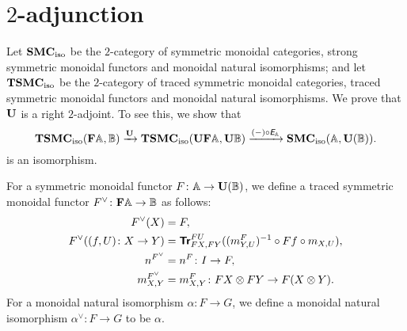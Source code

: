 
\section{\(2\)-adjunction}
\label{2-adjunction}

Let \(\mathbf{SMC}_{\mathrm{iso}}\) be the \(2\)-category of symmetric monoidal categories,
strong symmetric monoidal functors and monoidal natural
isomorphisms; and let \(\mathbf{TSMC}_{\mathrm{iso}}\) be the \(2\)-category of traced
symmetric monoidal categories, traced symmetric monoidal functors and
monoidal natural isomorphisms. We prove that
\(\mathbf{U}\) is a right \(2\)-adjoint. To see this, we show that
\begin{equation*}
  \mathbf{TSMC}_{\mathrm{iso}}(\mathbf{F}\mathbb{A},\mathbb{B}) \xrightarrow{\mathbf{U}}
  \mathbf{TSMC}_{\mathrm{iso}}(\mathbf{U}\mathbf{F}\mathbb{A},\mathbf{U}\mathbb{B}) \xrightarrow{(-) \circ \textit{\textsf{E}}_{\mathbb{A}}}
  \mathbf{SMC}_{\mathrm{iso}}(\mathbb{A},\mathbf{U}(\mathbb{\mathbb{B}})).
\end{equation*}
is an isomorphism.

For a symmetric monoidal functor \(F \colon \mathbb{A} \to \mathbf{U}(\mathbb{B})\),
we define a traced symmetric monoidal functor \(F^{\vee} \colon \mathbf{F}\mathbb{A} \to \mathbb{B}\)
as follows:
\begin{align*}
  F^{\vee}(X) &= F, \\
  F^{\vee}((f,U) \colon X \to Y)
  &= {\normalfont\textsf{\textbf{Tr}}}^{FU}_{FX,FY}((m_{Y,U}^{F})^{-1} \circ Ff \circ m_{X,U}), \\
  n^{F^{\vee}} &= n^{F} \colon I \to F, \\
  m^{F^{\vee}}_{X,Y} &= m^{F}_{X,Y} \colon FX \otimes FY \to F(X \otimes Y).
\end{align*}
For a monoidal natural isomorphism \(\alpha \colon F \to G\), we
define a monoidal natural isomorphism \(\alpha^{\vee} \colon F \to G\)
to be \(\alpha\).

